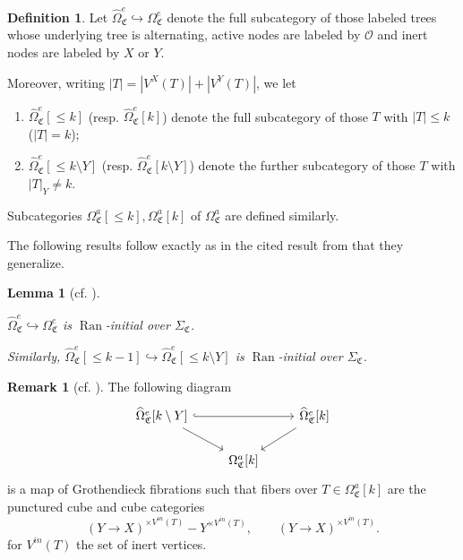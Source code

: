 \documentclass[a4paper,10pt
,draft
]{article}%
\numberwithin{equation}{section}
\numberwithin{figure}{section}
\newtheorem{lemma}[equation]{Lemma}%
\theoremstyle{definition} %
\newtheorem{definition}[equation]{Definition}%
\newtheorem{remark}[equation]{Remark}%
\newcommand{\into}{\hookrightarrow}%
\DeclareMathOperator{\Ran}{Ran}%
\renewcommand{\O}{\ensuremath{\mathcal O}}
\newcommand{\1}{\ensuremath{\mathbbm 1}}%
\newcommand{\SC}{\Sigma_{\mathfrak C}}
\newcommand{\OC}{\Omega_{\mathfrak C}}
\begin{document}
\begin{definition}
      Let
$\widehat{\Omega}_{\mathfrak C}^{e} \hookrightarrow \Omega_{\mathfrak C}^{e}$
denote the full subcategory of those labeled trees whose underlying tree is alternating, active nodes are labeled by $\O$ 
and inert nodes are labeled by $X$ or $Y$.

Moreover, writing $|T| = |V^X(T)|+ |V^Y(T)|$, we let
\begin{enumerate}[label=(\roman*)]
\item $\widehat{\Omega}_{\mathfrak C}^{e}[\leq k]$ (resp. $\widehat{\Omega}_{\mathfrak C}^{e}[k]$)
denote the full subcategory of those $T$ with $|T| \leq k$ ($|T|=k$);
\item $\widehat{\Omega}_{\mathfrak C}^{e}[\leq k \setminus Y]$ (resp. $\widehat{\Omega}_{\mathfrak C}^{e}[k \setminus Y]$)
denote the further subcategory of those $T$ with $|T|_Y \neq k$.
\end{enumerate}
Subcategories $\OC^a[\leq k], \OC^a[k]$ of $\OC^a$ are defined similarly.
\end{definition}



The following results follow exactly as in the cited result from 
\cite{BP_geo} that they generalize.

\begin{lemma}[{cf. \cite[Cor. 5.53, Lemma 5.58]{BP_geo}}]
\label{LANINT LEM}

	$\widehat\Omega_{\mathfrak C}^e \into 
	\Omega_{\mathfrak C}^e$
	is $\Ran$-initial over $\SC$.
     
	Similarly, $\widehat\Omega_{\mathfrak C}^e[\leq k-1] \into 
\widehat\Omega_{\mathfrak C}^e[\leq k \setminus Y]$
	is $\Ran$-initial over $\SC$.
\end{lemma}

\begin{remark}[{cf. \cite[Remark 5.57]{BP_geo}}]
      \label{OEFIB REM}
      The following diagram
      \begin{equation}
            \begin{tikzcd}
                  \widehat\Omega_{\mathfrak C}^e[k \setminus Y] \arrow[rr, hookrightarrow] \arrow[dr]
                  &&
                  \widehat\Omega_{\mathfrak C}^e[k] \arrow[dl]
                  \\
                  &
                  \Omega_{\mathfrak C}^a[k]
            \end{tikzcd}
      \end{equation}
	is a map of Grothendieck fibrations
	such that fibers over $T \in \Omega_{\mathfrak C}^a[k]$ are the punctured cube and cube categories
      \begin{equation}
            (Y \to X)^{\times V^{in}(T)} - Y^{\times V^{in}(T)},
            \qquad
            (Y \to X)^{\times V^{in}(T)}.
      \end{equation}
	for $V^{in}(T)$ the set of inert vertices.
\end{remark}
\end{document}
